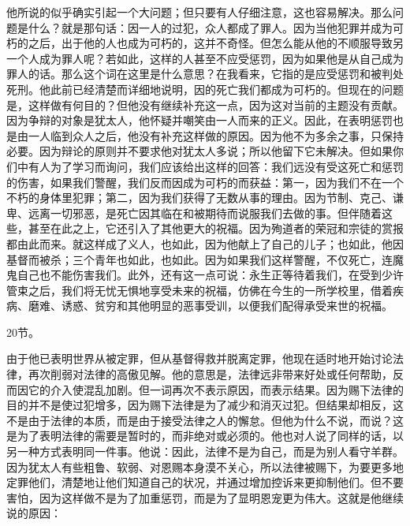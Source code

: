 他所说的似乎确实引起一个大问题；但只要有人仔细注意，这也容易解决。那么问题是什么？就是那句话：因一人的过犯，众人都成了罪人。因为当他犯罪并成为可朽的之后，出于他的人也成为可朽的，这并不奇怪。但怎么能从他的不顺服导致另一个人成为罪人呢？若如此，这样的人甚至不应受惩罚，因为如果他是从自己成为罪人的话。那么这个词在这里是什么意思？在我看来，它指的是应受惩罚和被判处死刑。他此前已经清楚而详细地说明，因的死亡我们都成为可朽的。但现在的问题是，这样做有何目的？但他没有继续补充这一点，因为这对当前的主题没有贡献。因为争辩的对象是犹太人，他怀疑并嘲笑由一人而来的正义。因此，在表明惩罚也是由一人临到众人之后，他没有补充这样做的原因。因为他不为多余之事，只保持必要。因为辩论的原则并不要求他对犹太人多说；所以他留下它未解决。但如果你们中有人为了学习而询问，我们应该给出这样的回答：我们远没有受这死亡和惩罚的伤害，如果我们警醒，我们反而因成为可朽的而获益：第一，因为我们不在一个不朽的身体里犯罪；第二，因为我们获得了无数从事的理由。因为节制、克己、谦卑、远离一切邪恶，是死亡因其临在和被期待而说服我们去做的事。但伴随着这些，甚至在此之上，它还引入了其他更大的祝福。因为殉道者的荣冠和宗徒的赏报都由此而来。就这样成了义人，也如此，因为他献上了自己的儿子；也如此，他因基督而被杀；三个青年也如此，也如此。因为如果我们这样警醒，不仅死亡，连魔鬼自己也不能伤害我们。此外，还有这一点可说：永生正等待着我们，在受到少许管束之后，我们将无忧无惧地享受未来的祝福，仿佛在今生的一所学校里，借着疾病、磨难、诱惑、贫穷和其他明显的恶事受训，以便我们配得承受来世的祝福。\par

20节。\par

由于他已表明世界从被定罪，但从基督得救并脱离定罪，他现在适时地开始讨论法律，再次削弱对法律的高傲见解。他的意思是，法律远非带来好处或任何帮助，反而因它的介入使混乱加剧。但一词再次不表示原因，而表示结果。因为赐下法律的目的并不是使过犯增多，因为赐下法律是为了减少和消灭过犯。但结果却相反，这不是由于法律的本质，而是由于接受法律之人的懈怠。但他为什么不说，而说？这是为了表明法律的需要是暂时的，而非绝对或必须的。他也对人说了同样的话，以另一种方式表明同一件事。他说：因此，法律不是为自己，而是为别人看守羊群。因为犹太人有些粗鲁、软弱、对恩赐本身漠不关心，所以法律被赐下，为要更多地定罪他们，清楚地让他们知道自己的状况，并通过增加控诉来更抑制他们。但不要害怕，因为这样做不是为了加重惩罚，而是为了显明恩宠更为伟大。这就是他继续说的原因：\par

